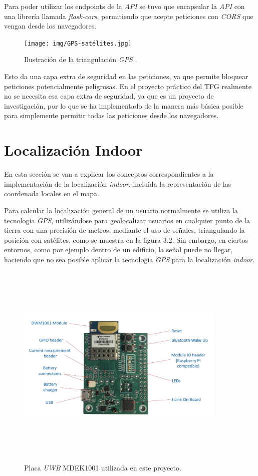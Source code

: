 Para poder utilizar los endpoints de la \textit{API} se tuvo que encapsular la \textit{API} con una librería llamada \textit{flask-cors}, permitiendo que acepte peticiones con \textit{CORS} que vengan desde los navegadores.
\begin{figure}[b]
    \centering
    \texttt{[image: img/GPS-satélites.jpg]}
    \caption{Ilustración de la triangulación \textit{GPS} \cite{TringulacionGPS}.}
    \label{fig:example_GPS}
\end{figure}
Esto da una capa extra de seguridad en las peticiones, ya que permite bloquear peticiones potencialmente peligrosas. En el proyecto práctico del TFG realmente no se necesita esa capa extra de seguridad, ya que es un proyecto de investigación, por lo que se ha implementado de la manera más básica posible para simplemente permitir todas las peticiones desde los navegadores.

\section{Localización Indoor}
En esta sección se van a explicar los conceptos correspondientes a la implementación de la localización \textit{indoor}, incluida la representación de las coordenada locales en el mapa.

Para calcular la localización general de un usuario normalmente se utiliza
la tecnologia \textit{GPS}, utilizándose para geolocalizar usuarios en cualquier
punto de la tierra con una precisión de metros, mediante el uso de señales,
triangulando la posición con satélites, como se muestra en la figura 3.2. Sin embargo, en ciertos entornos,
como por ejemplo dentro de un edificio, la señal puede no llegar, haciendo
que no sea posible aplicar la tecnologia \textit{GPS} para la localización \textit{indoor}. 

\begin{figure}[b]
    \centering
    \includegraphics[width=10cm,height=10cm,keepaspectratio]{img/MDEK1001.png}
    \caption{Placa \textit{UWB} MDEK1001 utilizada en este proyecto.}
    \label{fig:example_board}
\end{figure}


